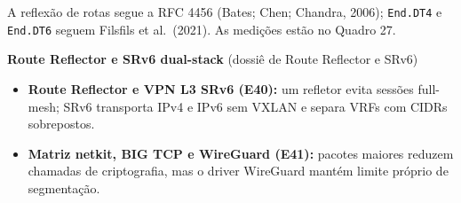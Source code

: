 \documentclass[12pt,openany,oneside,a4paper,chapter=TITLE,english,brazil]{abntex2}
\providecommand{\tightlist}{\setlength{\itemsep}{0pt}\setlength{\parskip}{0pt}}
\begin{document}
A reflexão de rotas segue a RFC 4456 (Bates; Chen; Chandra, 2006); \texttt{End.\allowbreak{}DT4} e \texttt{End.\allowbreak{}DT6} seguem Filsfils et al.~(2021). As medições estão no Quadro 27.

\textbf{Route Reflector e SRv6 dual-stack} (dossiê de Route Reflector e SRv6)

\begin{itemize}
\tightlist
\item
  \textbf{Route Reflector e VPN L3 SRv6 (E40):} um refletor evita sessões full-mesh; SRv6 transporta IPv4 e IPv6 sem VXLAN e separa VRFs com CIDRs sobrepostos.
\item
  \textbf{Matriz netkit, BIG TCP e WireGuard (E41):} pacotes maiores reduzem chamadas de criptografia, mas o driver WireGuard mantém limite próprio de segmentação.
\end{itemize}
\end{document}
